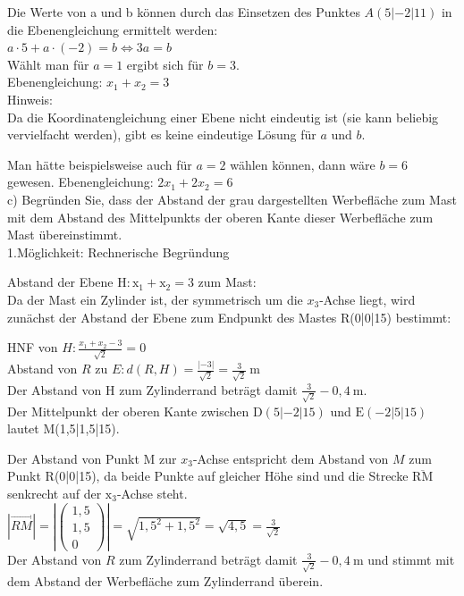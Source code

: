 \documentclass[10pt]{article}
\begin{document}
Die Werte von a und b können durch das Einsetzen des Punktes $A(5|-2| 11)$ in die Ebenengleichung ermittelt werden:\\
$a \cdot 5+a \cdot(-2)=b \Leftrightarrow 3 a=b$\\
Wählt man für $a=1$ ergibt sich für $b=3$.\\
Ebenengleichung: $x_{1}+x_{2}=3$\\
Hinweis:\\
Da die Koordinatengleichung einer Ebene nicht eindeutig ist (sie kann beliebig vervielfacht werden), gibt es keine eindeutige Lösung für $a$ und $b$.

Man hätte beispielsweise auch für $a=2$ wählen können, dann wäre $b=6$ gewesen. Ebenengleichung: $2 x_{1}+2 x_{2}=6$\\
c) Begründen Sie, dass der Abstand der grau dargestellten Werbefläche zum Mast mit dem Abstand des Mittelpunkts der oberen Kante dieser Werbefläche zum Mast übereinstimmt.\\
1.Möglichkeit: Rechnerische Begründung

Abstand der Ebene $\mathrm{H}: \mathrm{x}_{1}+\mathrm{x}_{2}=3$ zum Mast:\\
Da der Mast ein Zylinder ist, der symmetrisch um die $x_{3}$-Achse liegt, wird zunächst der Abstand der Ebene zum Endpunkt des Mastes R(0|0|15) bestimmt:

HNF von $H: \frac{x_{1}+x_{2}-3}{\sqrt{2}}=0$\\
Abstand von $R$ zu $E: d(R, H)=\frac{|-3|}{\sqrt{2}}=\frac{3}{\sqrt{2}} \mathrm{~m}$\\
Der Abstand von H zum Zylinderrand beträgt damit $\frac{3}{\sqrt{2}}-0,4 \mathrm{~m}$.\\
Der Mittelpunkt der oberen Kante zwischen $\mathrm{D}(5|-2| 15)$ und $\mathrm{E}(-2|5| 15)$ lautet M(1,5|1,5|15).

Der Abstand von Punkt M zur $x_{3}$-Achse entspricht dem Abstand von $M$ zum Punkt R(0|0|15), da beide Punkte auf gleicher Höhe sind und die Strecke $\overline{\mathrm{RM}}$ senkrecht auf der $\mathrm{x}_{3}$-Achse steht.\\
$|\overrightarrow{R M}|=\left|\left(\begin{array}{c}1,5 \\ 1,5 \\ 0\end{array}\right)\right|=\sqrt{1,5^{2}+1,5^{2}}=\sqrt{4,5}=\frac{3}{\sqrt{2}}$\\
Der Abstand von $R$ zum Zylinderrand beträgt damit $\frac{3}{\sqrt{2}}-0,4 \mathrm{~m}$ und stimmt mit dem Abstand der Werbefläche zum Zylinderrand überein.
\end{document}
